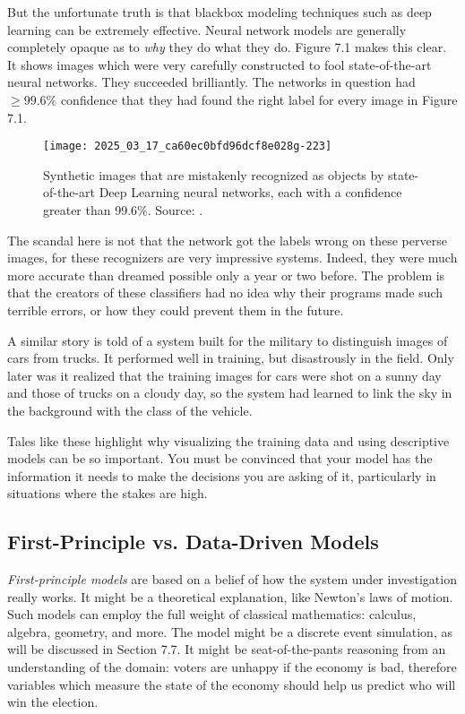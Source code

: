 \documentclass[10pt]{article}
\begin{document}
But the unfortunate truth is that blackbox modeling techniques such as deep learning can be extremely effective. Neural network models are generally completely opaque as to \textit{why} they do what they do. Figure 7.1 makes this clear. It shows images which were very carefully constructed to fool state-of-the-art neural networks. They succeeded brilliantly. The networks in question had \(\geq 99.6\%\) confidence that they had found the right label for every image in Figure 7.1.

\begin{figure}[h]
\centering
\texttt{[image: 2025\_03\_17\_ca60ec0bfd96dcf8e028g-223]}
\caption{Synthetic images that are mistakenly recognized as objects by state-of-the-art Deep Learning neural networks, each with a confidence greater than 99.6\%. Source: \cite{nguyen2015deep}.}
\end{figure}

The scandal here is not that the network got the labels wrong on these perverse images, for these recognizers are very impressive systems. Indeed, they were much more accurate than dreamed possible only a year or two before. The problem is that the creators of these classifiers had no idea why their programs made such terrible errors, or how they could prevent them in the future.

A similar story is told of a system built for the military to distinguish images of cars from trucks. It performed well in training, but disastrously in the field. Only later was it realized that the training images for cars were shot on a sunny day and those of trucks on a cloudy day, so the system had learned to link the sky in the background with the class of the vehicle.

Tales like these highlight why visualizing the training data and using descriptive models can be so important. You must be convinced that your model has the information it needs to make the decisions you are asking of it, particularly in situations where the stakes are high.

\subsection{First-Principle vs. Data-Driven Models}

\textit{First-principle models} are based on a belief of how the system under investigation really works. It might be a theoretical explanation, like Newton’s laws of motion. Such models can employ the full weight of classical mathematics: calculus, algebra, geometry, and more. The model might be a discrete event simulation, as will be discussed in Section 7.7. It might be seat-of-the-pants reasoning from an understanding of the domain: voters are unhappy if the economy is bad, therefore variables which measure the state of the economy should help us predict who will win the election.
\end{document}
